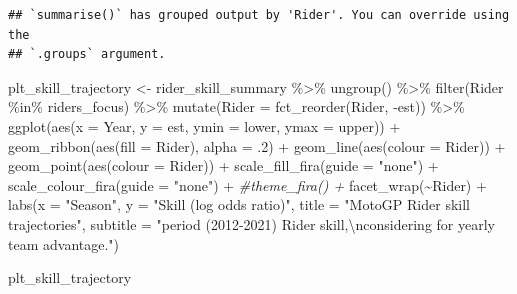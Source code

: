 \documentclass[
]{article}
\newenvironment{Shaded}{\begin{snugshade}}{\end{snugshade}}
\newcommand{\AttributeTok}[1]{\textcolor[rgb]{0.77,0.63,0.00}{#1}}
\newcommand{\CommentTok}[1]{\textcolor[rgb]{0.56,0.35,0.01}{\textit{#1}}}
\newcommand{\DecValTok}[1]{\textcolor[rgb]{0.00,0.00,0.81}{#1}}
\newcommand{\FunctionTok}[1]{\textcolor[rgb]{0.00,0.00,0.00}{#1}}
\newcommand{\NormalTok}[1]{#1}
\newcommand{\OtherTok}[1]{\textcolor[rgb]{0.56,0.35,0.01}{#1}}
\newcommand{\SpecialCharTok}[1]{\textcolor[rgb]{0.00,0.00,0.00}{#1}}
\newcommand{\StringTok}[1]{\textcolor[rgb]{0.31,0.60,0.02}{#1}}
\begin{document}
\begin{verbatim}
## `summarise()` has grouped output by 'Rider'. You can override using the
## `.groups` argument.
\end{verbatim}

\begin{Shaded}
\begin{Highlighting}[]
\NormalTok{plt\_skill\_trajectory }\OtherTok{\textless{}{-}}
\NormalTok{  rider\_skill\_summary }\SpecialCharTok{\%\textgreater{}\%}
  \FunctionTok{ungroup}\NormalTok{() }\SpecialCharTok{\%\textgreater{}\%}
  \FunctionTok{filter}\NormalTok{(Rider }\SpecialCharTok{\%in\%}\NormalTok{ riders\_focus) }\SpecialCharTok{\%\textgreater{}\%}
  \FunctionTok{mutate}\NormalTok{(}\AttributeTok{Rider =} \FunctionTok{fct\_reorder}\NormalTok{(Rider, }\SpecialCharTok{{-}}\NormalTok{est)) }\SpecialCharTok{\%\textgreater{}\%}
  \FunctionTok{ggplot}\NormalTok{(}\FunctionTok{aes}\NormalTok{(}\AttributeTok{x =}\NormalTok{ Year, }\AttributeTok{y =}\NormalTok{ est, }\AttributeTok{ymin =}\NormalTok{ lower, }\AttributeTok{ymax =}\NormalTok{ upper)) }\SpecialCharTok{+}
  \FunctionTok{geom\_ribbon}\NormalTok{(}\FunctionTok{aes}\NormalTok{(}\AttributeTok{fill =}\NormalTok{ Rider), }\AttributeTok{alpha =}\NormalTok{ .}\DecValTok{2}\NormalTok{) }\SpecialCharTok{+}
  \FunctionTok{geom\_line}\NormalTok{(}\FunctionTok{aes}\NormalTok{(}\AttributeTok{colour =}\NormalTok{ Rider)) }\SpecialCharTok{+}
  \FunctionTok{geom\_point}\NormalTok{(}\FunctionTok{aes}\NormalTok{(}\AttributeTok{colour =}\NormalTok{ Rider)) }\SpecialCharTok{+}
  \FunctionTok{scale\_fill\_fira}\NormalTok{(}\AttributeTok{guide =} \StringTok{"none"}\NormalTok{) }\SpecialCharTok{+}
  \FunctionTok{scale\_colour\_fira}\NormalTok{(}\AttributeTok{guide =} \StringTok{"none"}\NormalTok{) }\SpecialCharTok{+}
  \CommentTok{\#theme\_fira() +}
  \FunctionTok{facet\_wrap}\NormalTok{(}\SpecialCharTok{\textasciitilde{}}\NormalTok{Rider) }\SpecialCharTok{+}
  \FunctionTok{labs}\NormalTok{(}\AttributeTok{x =} \StringTok{"Season"}\NormalTok{, }\AttributeTok{y =} \StringTok{"Skill (log odds ratio)"}\NormalTok{, }\AttributeTok{title =} \StringTok{"MotoGP Rider skill trajectories"}\NormalTok{,}
       \AttributeTok{subtitle =} \StringTok{"period (2012{-}2021) Rider skill,}\SpecialCharTok{\textbackslash{}n}\StringTok{considering for yearly team advantage."}\NormalTok{)}


\NormalTok{plt\_skill\_trajectory}
\end{Highlighting}
\end{Shaded}
\end{document}
